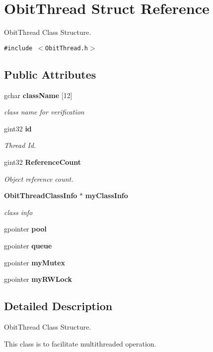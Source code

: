 \section{Obit\-Thread Struct Reference}
\label{structObitThread}
Obit\-Thread Class Structure.  


{\tt \#include $<$Obit\-Thread.h$>$}

\subsection*{Public Attributes}
\begin{CompactItemize}
\item 
gchar {\bf class\-Name} [12]
\begin{CompactList}\small\item\em class name for verification \item\end{CompactList}\item 
gint32 {\bf id}
\begin{CompactList}\small\item\em Thread Id. \item\end{CompactList}\item 
gint32 {\bf Reference\-Count}
\begin{CompactList}\small\item\em Object reference count. \item\end{CompactList}\item 
{\bf Obit\-Thread\-Class\-Info} $\ast$ {\bf my\-Class\-Info}
\begin{CompactList}\small\item\em class info \item\end{CompactList}\item 
gpointer {\bf pool}
\item 
gpointer {\bf queue}
\item 
gpointer {\bf my\-Mutex}
\item 
gpointer {\bf my\-RWLock}
\end{CompactItemize}


\subsection{Detailed Description}
Obit\-Thread Class Structure. 

This class is to facilitate multithreaded operation. 



